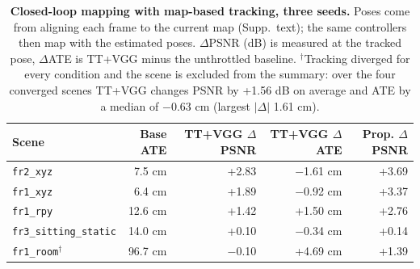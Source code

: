 \begin{table}[tbp]
\centering
\footnotesize\setlength{\tabcolsep}{3pt}
\begin{tabular}{lrrrr}
\toprule
\textbf{Scene} & \textbf{Base ATE} & \textbf{TT+VGG $\Delta$PSNR} & \textbf{TT+VGG $\Delta$ATE} & \textbf{Prop. $\Delta$PSNR} \\
\midrule
\texttt{fr2\_xyz} & 7.5 cm & +2.83 & $-$1.61 cm & +3.69 \\
\texttt{fr1\_xyz} & 6.4 cm & +1.89 & $-$0.92 cm & +3.37 \\
\texttt{fr1\_rpy} & 12.6 cm & +1.42 & +1.50 cm & +2.76 \\
\texttt{fr3\_sitting\_static} & 14.0 cm & +0.10 & $-$0.34 cm & +0.14 \\
\texttt{fr1\_room}$^\dagger$ & 96.7 cm & $-$0.10 & +4.69 cm & +1.39 \\
\bottomrule
\end{tabular}
\caption{\textbf{Closed-loop mapping with map-based tracking, three seeds.} Poses come from aligning each frame to the current map (Supp.\ text); the same controllers then map with the estimated poses. $\Delta$PSNR (dB) is measured at the tracked pose, $\Delta$ATE is TT+VGG minus the unthrottled baseline. $^\dagger$Tracking diverged for every condition and the scene is excluded from the summary: over the four converged scenes TT+VGG changes PSNR by +1.56 dB on average and ATE by a median of $-$0.63 cm (largest $|\Delta|$ 1.61 cm).}
\label{tab:closedloop}
\end{table}
